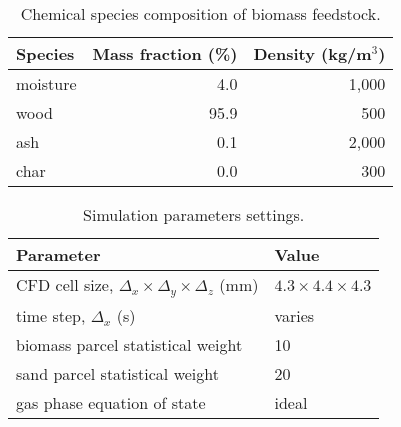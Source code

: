 \begin{table}[H]
    \centering
    \caption{Chemical species composition of biomass feedstock.}
    \begin{tabular}{lrr}
        \toprule
        Species & Mass fraction (\%) & Density (kg/m$^3$) \\
        \midrule
        moisture & 4.0  & 1,000 \\
        wood     & 95.9 & 500 \\
        ash      & 0.1  & 2,000 \\
        char     & 0.0  & 300 \\
        \bottomrule
    \end{tabular}
\end{table}

\begin{table}[H]
    \centering
    \caption{Simulation parameters settings.}
    \begin{tabular}{ll}
        \toprule
        Parameter & Value \\
        \midrule
        CFD cell size, $\Delta_x \times \Delta_y \times \Delta_z$ (mm) & $4.3 \times 4.4 \times 4.3$ \\
        time step, $\Delta_x$ (s)                                      & varies \\
        biomass parcel statistical weight                              & 10 \\
        sand parcel statistical weight                                 & 20 \\
        gas phase equation of state                                    & ideal \\
        \bottomrule
    \end{tabular}
\end{table}

